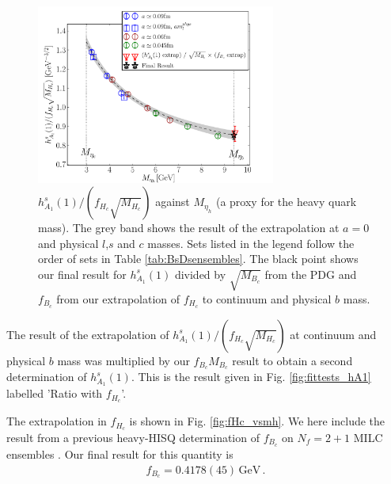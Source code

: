 \begin{figure}[htb!]
  \begin{center}
  \hspace{-10pt}
  \includegraphics[width=0.70\textwidth]{images/BsDsstar/hA1overfHc.pdf}
  \caption{ $h_{A_1}^s(1)/(f_{H_c}\sqrt{M_{H_c}})$ against $M_{\eta_h}$ (a proxy for the heavy quark mass). The grey band shows the result of the extrapolation at $a=0$ and physical $l$,$s$ and $c$ masses. Sets listed in the legend follow the order of sets in Table \ref{tab:BsDsensembles}. The black point shows our final result for $h_{A_1}^s(1)$ divided by $\sqrt{M_{B_c}}$ from the PDG \cite{PhysRevD.98.030001} and $f_{B_c}$ from our extrapolation of $f_{H_c}$ to continuum and physical $b$ mass.
    \label{fig:fHc}}
  \end{center}
\end{figure}


The result of the extrapolation of $h_{A_1}^s(1)/(f_{H_c}\sqrt{M_{H_c}})$ at continuum and physical $b$ mass was multiplied by our $f_{B_c}M_{B_c}$ result to obtain a second determination of $h_{A_1}^s(1)$. This is the result given in Fig. \ref{fig:fittests_hA1} labelled 'Ratio with $f_{H_c}$'.

The extrapolation in $f_{H_c}$ is shown in Fig. \ref{fig:fHc_vsmh}. We here include the result from a previous heavy-HISQ determination of $f_{B_c}$ on $N_f=2+1$ MILC ensembles \cite{McNeile:2012qf}. Our final result for this quantity is
\begin{align}
  f_{B_c} = 0.4178(45)\,\text{GeV}\,.
\end{align}

